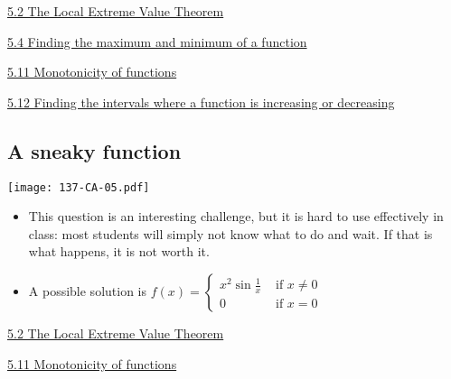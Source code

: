 \documentclass[11pt]{article}
\newcommand {\DS} [1] {${\displaystyle #1}$}
\newcommand{\nl}{\hfill \vspace{-1.1\baselineskip}} %
\newcommand{\vii}{\hspace{8mm} \href{https://www.youtube.com/watch?v=_z8OglXFIq8&list=PLlwePzQY_wW9m5oabUf6hvfVfAaA9uAwM&index=2}{5.2 The Local Extreme Value Theorem}}
\newcommand{\viv}{\hspace{8mm} \href{https://www.youtube.com/watch?v=_giwkVIFeGY&list=PLlwePzQY_wW9m5oabUf6hvfVfAaA9uAwM&index=4}{5.4 Finding the maximum and minimum of a function}}
\newcommand{\vxi}{\hspace{8mm} \href{https://www.youtube.com/watch?v=HlzVrFcqi04&list=PLlwePzQY_wW9m5oabUf6hvfVfAaA9uAwM&index=11}{5.11 Monotonicity of functions}}
\newcommand{\vxii}{\hspace{8mm} \href{https://www.youtube.com/watch?v=HsMHLIwKmFo&list=PLlwePzQY_wW9m5oabUf6hvfVfAaA9uAwM&index=12}{5.12 Finding the intervals where a function is increasing or decreasing}}
\begin{document}
\begin{videos}
\vii

\viv

\vxi

\vxii
\end{videos}

\newpage
\subsection{A sneaky function}

\begin{center}
{ \texttt{[image: 137-CA-05.pdf]}} 
\end{center}


\begin{comments}
\nl
\begin{itemize}
\item This question is an interesting challenge, but it is hard to use effectively in class:
 most students will simply not know what to do and wait.  If that is what happens, it is not worth it.
\item A possible solution is \DS{f(x) = \begin{cases} x^2 \sin \frac{1}{x} & \mbox{ if } x \neq 0 \\ 0 & \mbox{ if } x =0 \end{cases}}
\end{itemize}	
\end{comments}

\begin{videos}
\vii

\vxi
\end{videos}

\newpage


\end{document}
